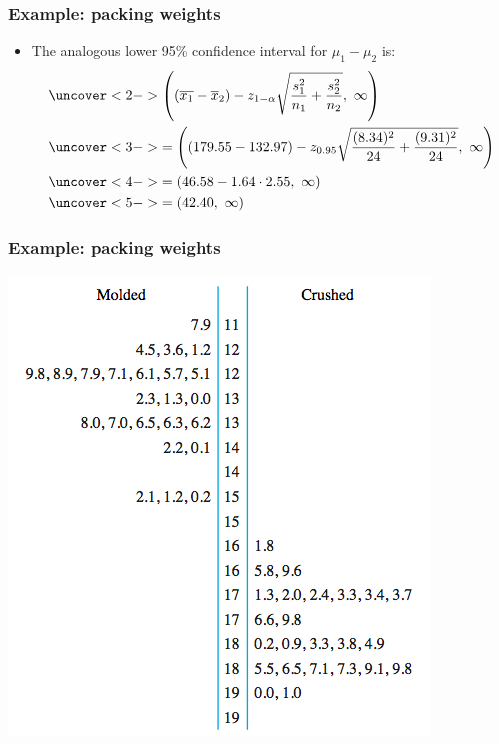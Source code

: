 \documentclass[handout]{beamer}\usepackage[]{graphicx}\usepackage[]{color}
\providecommand{\ov}[1]{\overline{#1}}
\numberwithin{equation}{section}
\begin{document}
\begin{frame}
\frametitle{Example: packing weights}
\begin{itemize}
\item The analogous lower 95\% confidence interval for $\mu_1 - \mu_2$ is:
\begin{align*}
&\uncover<2->{\left ((\ov{x_1} - \ov{x}_2) - z_{1 - \alpha} \sqrt{\frac{s^2_1}{n_1} + \frac{s^2_2}{n_2}}, \ \infty \right )}  \\
&\uncover<3->{= \left ((179.55 - 132.97) - z_{0.95} \sqrt{\frac{(8.34)^2}{24} + \frac{(9.31)^2}{24}}, \ \infty \right )} \\
&\uncover<4->{= (46.58 - 1.64 \cdot 2.55, \ \infty)} \\
&\uncover<5->{= (42.40, \ \infty)}
\end{align*}
\end{itemize}
\end{frame}


\begin{frame}
\frametitle{Example: packing weights}
\begin{center}
 \includegraphics{../../fig/solidsstem.png}
\end{center}
\end{frame}
\end{document}
